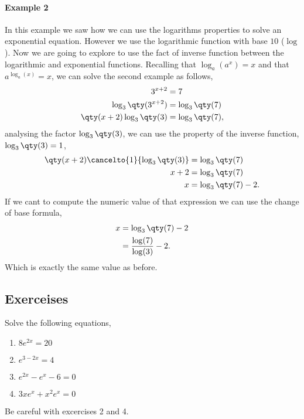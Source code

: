 \documentclass[../main.tex]{subfiles}
\begin{document}
\paragraph{Example 2} In this example we saw how we can use the logarithms properties to solve an exponential equation.
However we use the logarithmic function with base $10$ ($\log$).
Now we are going to explore to use the fact of inverse function between the logarithmic and exponential functions.
Recalling that $\log_a(a^x) = x$ and that $a^{\log_a(x)} = x$, we can solve the second example as follows,
\begin{align*}
    3^{x+2} &= 7 \\
    \log_3\qty(3^{x+2}) &= \log_3\qty(7) \\
    \qty(x+2)\log_3\qty(3) &= \log_3\qty(7), 
\end{align*}
analysing the factor $\log_3\qty(3)$, we can use the property of the inverse function, $\log_3\qty(3)=1$,
\begin{align*}
    \qty(x+2)\cancelto{1}{\log_3\qty(3)} &= \log_3\qty(7) \\
    x+2 &= \log_3\qty(7) \\
    x &= \log_3\qty(7) - 2.
\end{align*}
If we cant to compute the numeric value of that expression we can use the change of base formula,
\begin{align*}
    x &= \log_3\qty(7) - 2 \\
      &= \frac{\log(7)}{\log(3)} -2.
\end{align*}
Which is exactly the same value as before.

\subsection{Exerceises}
Solve the following equations,
\begin{enumerate}
    \item $8e^{2x} = 20$
    \item $e^{3-2x} = 4$
    \item $e^{2x}-e^{x}-6=0$
    \item $3xe^x + x^2e^x = 0 $
\end{enumerate}

Be careful with excercises 2 and 4.
\end{document}

